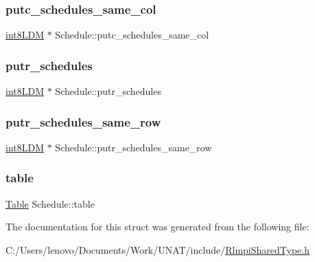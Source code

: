 \mbox{\label{structSchedule_a3944a11a393685264fdd5b2067ed5950}} 
\subsubsection{\texorpdfstring{putc\_schedules\_same\_col}{putc\_schedules\_same\_col}}
{\footnotesize\ttfamily \mbox{\hyperlink{include_2RlmpiShared_8h_a69782ffde89d45e86308f10afedf08a6}{int8\+L\+DM}} $\ast$ Schedule\+::putc\+\_\+schedules\+\_\+same\+\_\+col}

\mbox{\label{structSchedule_aa0610471756372c5b0c37a97f9cce156}} 
\subsubsection{\texorpdfstring{putr\_schedules}{putr\_schedules}}
{\footnotesize\ttfamily \mbox{\hyperlink{include_2RlmpiShared_8h_a69782ffde89d45e86308f10afedf08a6}{int8\+L\+DM}} $\ast$ Schedule\+::putr\+\_\+schedules}

\mbox{\label{structSchedule_a56d343a3f678f6235ba9c7553afbf3ba}} 
\subsubsection{\texorpdfstring{putr\_schedules\_same\_row}{putr\_schedules\_same\_row}}
{\footnotesize\ttfamily \mbox{\hyperlink{include_2RlmpiShared_8h_a69782ffde89d45e86308f10afedf08a6}{int8\+L\+DM}} $\ast$ Schedule\+::putr\+\_\+schedules\+\_\+same\+\_\+row}

\mbox{\label{structSchedule_ae259737ec627f66a8f4a81877520983c}} 
\subsubsection{\texorpdfstring{table}{table}}
{\footnotesize\ttfamily \mbox{\hyperlink{structTable}{Table}} Schedule\+::table}



The documentation for this struct was generated from the following file\+:\begin{DoxyCompactItemize}
\item 
C\+:/\+Users/lenovo/\+Documents/\+Work/\+U\+N\+A\+T/include/\mbox{\hyperlink{include_2RlmpiSharedType_8h}{Rlmpi\+Shared\+Type.\+h}}\end{DoxyCompactItemize}
